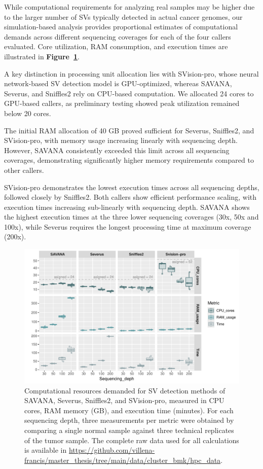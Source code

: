 While computational requirements for analyzing real samples may be higher due to 
the larger number of SVs typically detected in actual cancer genomes, our 
simulation-based analysis provides proportional estimates of computational 
demands across different sequencing coverages for each of the four callers 
evaluated. Core utilization, RAM consumption, and execution times are 
illustrated in \textbf{Figure~\ref{fig:hpc_calls}}.

A key distinction in processing unit allocation lies with SVision-pro, whose 
neural network-based SV detection model is GPU-optimized, whereas SAVANA, 
Severus, and Sniffles2 rely on CPU-based computation. We allocated 24 cores to 
GPU-based callers, as preliminary testing showed peak utilization remained 
below 20 cores.

The initial RAM allocation of 40 GB proved sufficient for Severus, Sniffles2, 
and SVision-pro, with memory usage increasing linearly with sequencing depth. 
However, SAVANA consistently exceeded this limit across all 
sequencing coverages, demonstrating significantly higher memory requirements 
compared to other callers.

SVision-pro demonstrates the lowest execution times across all sequencing 
depths, followed closely by Sniffles2. Both callers show efficient performance 
scaling, with execution times increasing sub-linearly with sequencing depth. 
SAVANA shows the highest execution times at the three lower sequencing 
coverages (30x, 50x and 100x), while Severus requires the longest processing 
time at maximum coverage (200x).

\begin{figure}[H]
    \centering
    \includegraphics[width=\textwidth]{data/cluster_bmk/hpc_calls.pdf}
    \caption[Computational resource demanded for SV detection methods]{
    Computational resources demanded for SV detection methods of SAVANA, 
    Severus, Sniffles2, and SVision-pro, measured in CPU cores, RAM memory (GB), 
    and execution time (minutes). For each sequencing depth, three measurements 
    per metric were obtained by comparing a single normal sample against three
    technical replicates of the tumor sample. The complete raw data used for
    all calculations is available in 
    \url{https://github.com/villena-francis/master_thesis/tree/main/data/cluster_bmk/hpc_data}.}
    \label{fig:hpc_calls}
\end{figure}

